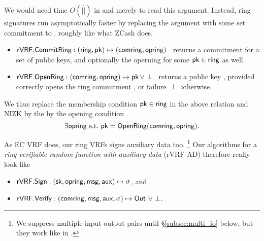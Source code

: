 We would need time $O(|\ring|)$ in \rSign and \rVerify merely to read
this \ring argument.  Instead, ring signatures run asymptotically faster
by replacing the \ring argument with some set commitment to \ring,
roughly like what ZCash does.
\begin{itemize}
\item ${\mathsf{rVRF}}.{\mathsf{CommitRing}} : (\mathsf{ring},\mathsf{pk}) \mapsto (\mathsf{comring},\mathsf{opring})$ \,
    returns a commitment for a set \ring of public keys, and
    optionally the operning \openring for some $\mathsf{pk} \in \mathsf{ring}$ as well.
\item ${\mathsf{rVRF}}.{\mathsf{OpenRing}} : (\mathsf{comring},\mathsf{opring}) \mapsto \mathsf{pk} \, \lor \perp$ \,
    returns a public key \pk, provided \openring correctly opens
    the ring commitment \comring, or failure $\perp$ otherwise.
\end{itemize}

We thus replace the membership condition $\mathsf{pk} \in \mathsf{ring}$ in the above
relation and NIZK by the by the opening condition
$$ \exists \mathsf{opring} \textrm{\ s.t.\ } \mathsf{pk} = {\mathsf{OpenRing}}(\mathsf{comring},\mathsf{opring}) . $$
%

As EC VRF does, our ring VRFs signs auxiliary data \aux too.%
\footnote{We suppress multiple input-output pairs until \S\ref{subsec:multi_io} below, but they work like in \cite{PrivacyPass}.}
Our algorithms for a {\em ring verifiable random function
with auxiliary data} (rVRF-AD) therefore really look like
\begin{itemize}
\item ${\mathsf{rVRF}}.{\mathsf{Sign}} : (\mathsf{sk},\mathsf{opring},\mathsf{msg},\mathsf{aux}) \mapsto \sigma$, \quad and
\item ${\mathsf{rVRF}}.{\mathsf{Verify}} : (\mathsf{comring},\mathsf{msg},\mathsf{aux},\sigma) \mapsto {\ensuremath{\mathsf{Out}}} \,\, \lor \perp$.
\end{itemize}

